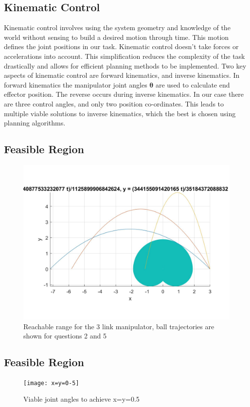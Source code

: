 \documentclass[twoside,twocolumn]{article}
\begin{document}
\subsection{Kinematic Control}
Kinematic control involves using the system geometry and knowledge of the world without sensing to build a desired motion through time. This motion defines the joint positions in our task. Kinematic control doesn't take forces or accelerations into account. This simplification reduces the complexity of the task drastically and allows for efficient planning methods to be implemented.
\newline
Two key aspects of kinematic control are forward kinematics, and inverse kinematics. In forward kinematics the manipulator joint angles $\boldsymbol{\theta}$ are used to calculate end effector position. The reverse occurs during inverse kinematics. In our case there are three control angles, and only two position co-ordinates. This leads to multiple viable solutions to inverse kinematics, which the best is chosen using planning algorithms.
\subsection{Feasible Region}
\begin{figure}[h]
  \centering
    \includegraphics[width=\linewidth]{trajectory}
  \caption{Reachable range for the 3 link manipulator, ball trajectories are shown for questions 2 and 5}
  \label{fig:reachable_range}
\end{figure}

\subsection{Feasible Region}
\begin{figure}[h]
  \centering
    \texttt{[image: x=y=0-5]}
  \caption{Viable joint angles to achieve x=y=0.5}
  \label{fig:sol}
\end{figure}
\end{document}
